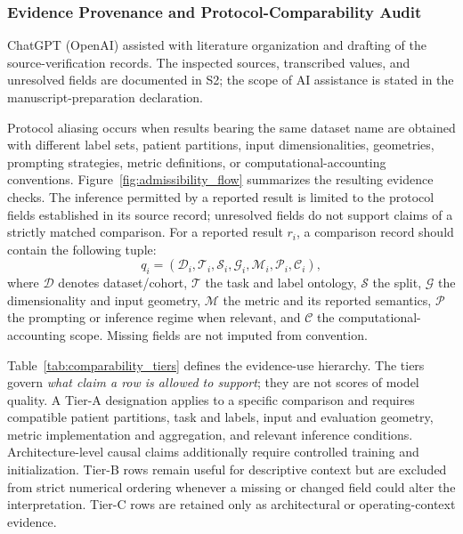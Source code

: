 \documentclass[5p,times,authoryear]{elsarticle}
\begin{document}
\subsubsection{Evidence Provenance and Protocol-Comparability Audit}
\label{subsec:evidence_audit}

ChatGPT (OpenAI) assisted with literature organization and drafting of the source-verification records. The inspected sources, transcribed values, and unresolved fields are documented in S2; the scope of AI assistance is stated in the manuscript-preparation declaration.

Protocol aliasing occurs when results bearing the same dataset name are obtained with different label sets, patient partitions, input dimensionalities, geometries, prompting strategies, metric definitions, or computational-accounting conventions. Figure~\ref{fig:admissibility_flow} summarizes the resulting evidence checks. The inference permitted by a reported result is limited to the protocol fields established in its source record; unresolved fields do not support claims of a strictly matched comparison. For a reported result $r_i$, a comparison record should contain the following tuple:
\begin{equation}
q_i=(\mathcal{D}_i,\mathcal{T}_i,\mathcal{S}_i,\mathcal{G}_i,\mathcal{M}_i,\mathcal{P}_i,\mathcal{C}_i),
\label{eq:evidence_tuple}
\end{equation}
where $\mathcal{D}$ denotes dataset/cohort, $\mathcal{T}$ the task and label ontology, $\mathcal{S}$ the split, $\mathcal{G}$ the dimensionality and input geometry, $\mathcal{M}$ the metric and its reported semantics, $\mathcal{P}$ the prompting or inference regime when relevant, and $\mathcal{C}$ the computational-accounting scope. Missing fields are not imputed from convention.

Table~\ref{tab:comparability_tiers} defines the evidence-use hierarchy. The tiers govern \emph{what claim a row is allowed to support}; they are not scores of model quality. A Tier-A designation applies to a specific comparison and requires compatible patient partitions, task and labels, input and evaluation geometry, metric implementation and aggregation, and relevant inference conditions. Architecture-level causal claims additionally require controlled training and initialization. Tier-B rows remain useful for descriptive context but are excluded from strict numerical ordering whenever a missing or changed field could alter the interpretation. Tier-C rows are retained only as architectural or operating-context evidence.
\end{document}
